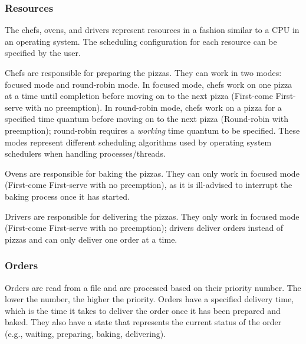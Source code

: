 \documentclass[conference]{IEEEtran}
\begin{document}
\subsubsection{Resources}
The chefs, ovens, and drivers represent resources in a fashion similar to a CPU in an operating system. The scheduling configuration for each resource can be specified by the user. 

Chefs are responsible for preparing the pizzas. They can work in two modes: focused mode and round-robin mode. In focused mode, chefs work on one pizza at a time until completion before moving on to the next pizza (First-come First-serve with no preemption). In round-robin mode, chefs work on a pizza for a specified time quantum before moving on to the next pizza (Round-robin with preemption); round-robin requires a \textit{working} time quantum to be specified. These modes represent different scheduling algorithms used by operating system schedulers when handling processes/threads. 

Ovens are responsible for baking the pizzas. They can only work in focused mode (First-come First-serve with no preemption), as it is ill-advised to interrupt the baking process once it has started. 

Drivers are responsible for delivering the pizzas. They only work in focused mode (First-come First-serve with no preemption); drivers deliver orders instead of pizzas and can only deliver one order at a time.

\subsubsection{Orders}
Orders are read from a file and are processed based on their priority number. The lower the number, the higher the priority. Orders have a specified delivery time, which is the time it takes to deliver the order once it has been prepared and baked. They also have a state that represents the current status of the order (e.g., waiting, preparing, baking, delivering).
\end{document}
